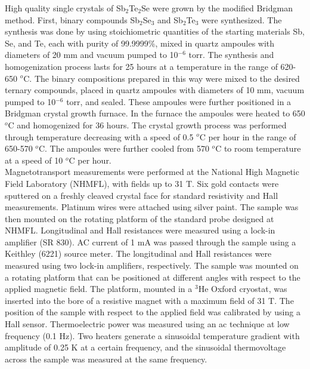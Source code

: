 \documentclass[aps,prb,twocolumn,showpacs,groupedaddress]{revtex4-1}
\begin{document}
High quality single crystals of Sb$_2$Te$_2$Se were grown by the modified Bridgman method. First, binary compounds Sb$_2$Se$_3$ and Sb$_2$Te$_3$ were synthesized. The synthesis was done by using stoichiometric quantities of the starting materials Sb, Se, and Te, each with purity of 99.9999\%, mixed in quartz ampoules with diameters of 20 mm and vacuum pumped to 10$^{-6}$ torr. The synthesis and homogenization process lasts for 25 hours at a temperature in the range of 620-650 $^{o}$C. The binary compositions prepared in this way were mixed to the desired ternary compounds, placed in quartz ampoules with diameters of 10 mm, vacuum pumped to 10$^{-6}$ torr, and sealed. These ampoules were further positioned in a Bridgman crystal growth furnace. In the furnace the ampoules were heated to 650 $^{o}$C and homogenized for 36 hours. The crystal growth process was performed through temperature decreasing with a speed of 0.5 $^o$C per hour in the range of 650-570 $^o$C. The ampoules were further cooled from 570 $^{o}$C to room temperature at a speed of 10 $^o$C per hour.\\
\indent Magnetotransport measurements were performed at the National High Magnetic Field Laboratory (NHMFL), with fields up to 31 T. Six gold contacts were sputtered on a freshly cleaved crystal face for standard resistivity and Hall measurements. Platinum wires were attached using silver paint. The sample was then mounted on the rotating platform of the standard probe designed at NHMFL. Longitudinal and Hall resistances were measured using a lock-in amplifier (SR 830). AC current of 1 mA was passed through the sample using a Keithley (6221) source meter. The longitudinal and Hall resistances were measured using two lock-in amplifiers, respectively. The sample was mounted on a rotating platform that can be positioned at different angles with respect to the applied magnetic field. The platform, mounted in a $^3$He Oxford cryostat, was inserted into the bore of a resistive magnet with a maximum field of 31 T. The position of the sample with respect to the applied field was calibrated by using a Hall sensor. Thermoelectric power was measured using an ac technique at low frequency (0.1 Hz). Two heaters generate a sinusoidal temperature gradient with amplitude of 0.25 K at a certain frequency, and the sinusoidal thermovoltage across the sample was measured at the same frequency.
\end{document}
